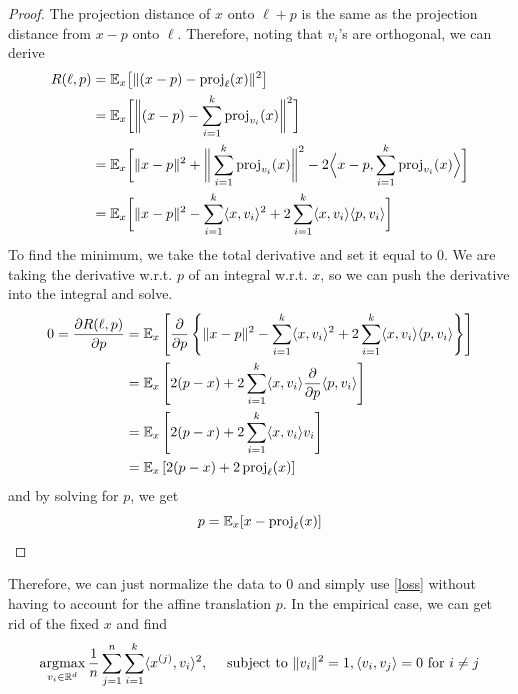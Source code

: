   \begin{proof}
    The projection distance of $x$ onto $\ell + p$ is the same as the projection distance from $x-p$ onto $\ell$. Therefore, noting that $v_i$'s are orthogonal, we can derive
    \begin{align}
      R(\ell, p) & = \mathbb{E}_x \big[ \| (x - p) - \operatorname{proj}_\ell (x) \|^2 \big] \\
                 & = \mathbb{E}_x \bigg[ \bigg\| (x - p) - \sum_{i=1}^k \operatorname{proj}_{v_i} (x) \bigg\|^2 \bigg] \\ 
                 & = \mathbb{E}_x \bigg[ \|x - p\|^2 + \bigg\| \sum_{i=1}^k \operatorname{proj}_{v_i} (x) \bigg\|^2 - 2 \Big\langle x - p, \sum_{i=1}^k \operatorname{proj}_{v_i} (x) \Big\rangle \bigg] \\ 
                 & = \mathbb{E}_x \bigg[ \|x - p\|^2 - \sum_{i=1}^k \langle x, v_i \rangle^2 + 2 \sum_{i=1}^k \langle x, v_i \rangle \langle p, v_i \rangle \bigg] 
    \end{align}
    To find the minimum, we take the total derivative and set it equal to $0$. We are taking the derivative w.r.t. $p$ of an integral w.r.t. $x$, so we can push the derivative into the integral and solve. 
    \begin{align}
      0 = \frac{\partial R(\ell, p)}{\partial p} 
        &= \mathbb{E}_x \left[ \frac{\partial}{\partial p} \left\{ \|x - p\|^2 - \sum_{i=1}^k \langle x, v_i \rangle^2 + 2 \sum_{i=1}^k \langle x, v_i \rangle \langle p, v_i \rangle \right\} \right] \\
        &= \mathbb{E}_x \left[ 2(p - x) + 2 \sum_{i=1}^k \langle x, v_i \rangle \frac{\partial}{\partial p} \langle p, v_i \rangle \right]  \\ 
        &= \mathbb{E}_x \left[ 2(p - x) + 2 \sum_{i=1}^k \langle x, v_i \rangle v_i \right]  \\ 
        &= \mathbb{E}_x \left[ 2(p - x) + 2 \operatorname{proj}_{\ell} (x) \right]
    \end{align}
    and by solving for $p$, we get 
    \begin{equation}
      p = \mathbb{E}_{x} [x - \operatorname{proj}_\ell (x)]
    \end{equation}
  \end{proof}

  Therefore, we can just normalize the data to $0$ and simply use \ref{loss} without having to account for the affine translation $p$. In the empirical case, we can get rid of the fixed $x$ and find 
  \begin{equation}
    \operatorname*{\arg\!\max}_{v_i \in \mathbb{R}^d} \frac{1}{n} \sum_{j=1}^n \sum_{i=1}^k \langle x^{(j)}, v_i \rangle^2, \quad \text{ subject to } \|v_i\|^2 = 1, \langle v_i, v_j \rangle = 0 \text{ for } i \neq j
  \end{equation} 

